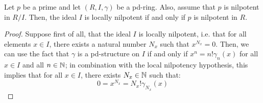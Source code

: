                 \begin{proposition} \label{prop: p_powers_in_pd_rings}
                    Let $p$ be a prime and let $(R, I , \gamma)$ be a pd-ring. Also, assume that $p$ is nilpotent in $R/I$. Then, the ideal $I$ is locally nilpotent if and only if $p$ is nilpotent in $R$. 
                \end{proposition}
                    \begin{proof}
                        Suppose first of all, that the ideal $I$ is locally nilpotent, i.e. that for all elements $x \in I$, there exists a natural number $N_x$ such that $x^{N_x} = 0$. Then, we can use the fact that $\gamma$ is a pd-structure on $I$ if and only if $x^n = n!\gamma_n(x)$ for all $x \in I$ and all $n \in \mathbb{N}$; in combination with the local nilpotency hypothesis, this implies that for all $x \in I$, there exists $N_x \in \mathbb{N}$ such that:
                            $$0 = x^{N_x} = N_x!\gamma_{N_x}(x)$$
                    \end{proof}
                    
